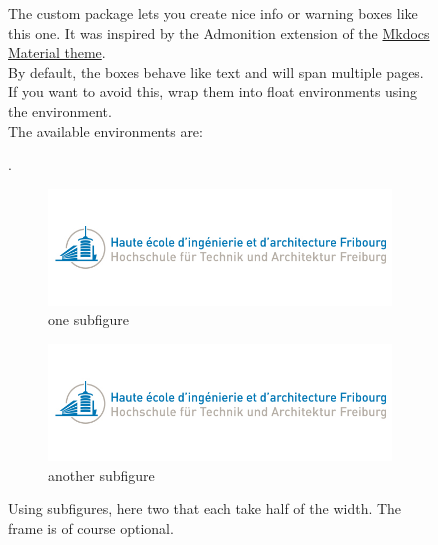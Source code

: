 \clearpage

\begin{figure}[ht!]
    \begin{infobox}
        The custom package  lets you create nice info or warning boxes like this one. It was inspired by the Admonition extension of the \href{https://squidfunk.github.io/mkdocs-material/extensions/admonition/}{Mkdocs Material theme}. \\
        By default, the boxes behave like text and will span multiple pages. If you want to avoid this, wrap them into float environments using the  environment. \\
    
        The available environments are:
        \begin{itemize*}[label=$\cdot$]
            \item {}
            \item {}
            \item {}
            \item {}.
        \end{itemize*}
    \end{infobox}
\end{figure}


\begin{figure}[ht]
    \begin{mdframed}[linecolor=gray]
        \begin{subfigure}[c]{.5\textwidth}
            \includegraphics[width=\textwidth]{logo} 
            \caption{one subfigure}
            \label{fig:subfigs-1}
        \end{subfigure}%
        \begin{subfigure}[c]{.5\textwidth}
            \includegraphics[width=\textwidth]{logo} 
            \caption{another subfigure}
            \label{fig:subfigs-2}
        \end{subfigure}
    \end{mdframed}
    \caption{Using subfigures, here two that each take half of the width. The frame is of course optional.}
    \label{fig:subfigs}
\end{figure}
